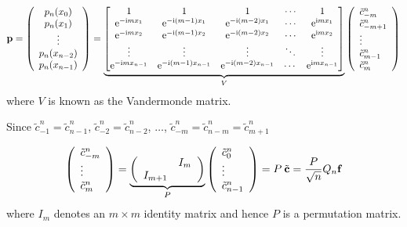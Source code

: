 \documentclass[12pt,landscape]{article}
\begin{document}
{\[
\mathbf{p} = \left(
\begin{array}{c}
p_n(x_0) \\
p_n(x_1) \\
\vdots \\
p_n(x_{n-2}) \\
p_n(x_{n-1})
\end{array}
\right)
=
\underbrace{\begin{bmatrix}
1 & 1 & 1&  \ensuremath{\cdots} & 1 \\
{\rm e}^{-{\rm i}m x_1} & {\rm e}^{-{\rm i}(m-1) x_1} &  {\rm e}^{-{\rm i}(m-2) x_1} & \ensuremath{\cdots} & {\rm e}^{{\rm i} m x_1} \\
{\rm e}^{-{\rm i}m x_2} & {\rm e}^{-{\rm i}(m-1) x_2} &  {\rm e}^{-{\rm i}(m-2) x_2} & \ensuremath{\cdots} & {\rm e}^{{\rm i} m x_2} \\
\ensuremath{\vdots} & \ensuremath{\vdots} & \ensuremath{\vdots} & \ensuremath{\ddots} & \ensuremath{\vdots} \\
{\rm e}^{-{\rm i}m x_{n-1}}& {\rm e}^{-{\rm i}(m-1)x_{n-1}}& {\rm e}^{-{\rm i}(m-2)x_{n-1}}& \cdots & {\rm e}^{{\rm i}m x_{n-1}}
\end{bmatrix}}_{V} 
\left(
\begin{array}{l}
\tilde{c}^n_{-m} \\
\tilde{c}^n_{-m+1} \\
\vdots \\
\tilde{c}^n_{m-1} \\
\tilde{c}^n_{m}
\end{array}
\right)
\]
where $V$ is known as the Vandermonde matrix.

Since $\tilde{c}^n_{-1} = \tilde{c}^n_{n-1}$, $\tilde{c}^n_{-2} = \tilde{c}^n_{n-2}$, $\ldots$, $\tilde{c}^n_{-m} = \tilde{c}^n_{n-m} = \tilde{c}^n_{m+1}$

\[
\left(
\begin{array}{l}
\tilde{c}^n_{-m} \\
\vdots \\
\tilde{c}^n_{m}
\end{array}
\right) = 
\underbrace{\left(
\begin{array}{c c}
   & I_{m} \\
I_{m+1} & 
\end{array}
\right)}_{P}
\left(
\begin{array}{l}
\tilde{c}^n_{0} \\
\vdots \\
\tilde{c}^n_{n-1}
\end{array}
\right) = P\: \tilde{\mathbf{c}} = \frac{P}{\sqrt{n}}Q_{n}\mathbf{f}
\]
where $I_m$ denotes an $m\times m$ identity matrix and hence $P$ is a permutation matrix.

}
\end{document}
